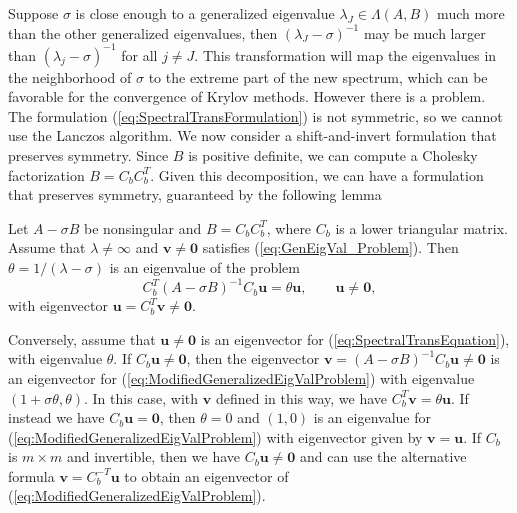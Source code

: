 Suppose $\sigma$ is close enough to a generalized eigenvalue $\lambda_J \in \Lambda(A, B)$ much more than the other generalized eigenvalues, then $(\lambda_J - \sigma)^{-1}$ may be much larger than $(\lambda_j - \sigma)^{-1}$ for all $j \neq J$. This transformation will map the eigenvalues in the neighborhood of $\sigma$ to the extreme part of the new spectrum, which can be favorable for the convergence of Krylov methods.  However there is a problem.  The formulation (\ref{eq:SpectralTransFormulation}) is not symmetric, so we cannot use the Lanczos algorithm.  We now consider a shift-and-invert formulation that preserves symmetry. Since $B$ is positive definite, we can compute a Cholesky factorization $B = C_bC_b^T$. Given this decomposition, we can have a formulation that preserves symmetry, guaranteed by the following lemma
 \begin{lemma}\label{lemma:SpectralTransLemma}
 	Let $A-\sigma B$ be nonsingular and $B = C_bC_b^T$, where $C_b$ is a lower triangular matrix. Assume that $\lambda \neq \infty$ and $\mathbf{v} \neq \mathbf{0}$ satisfies (\ref{eq:GenEigVal_Problem}). Then $\theta = 1/(\lambda - \sigma)$  is an eigenvalue of the problem
 	\begin{equation}\label{eq:SpectralTransEquation}
 		C_b^T(A-\sigma B)^{-1}C_b \mathbf{u} = \theta \mathbf{u}, \qquad \mathbf{u} \neq \mathbf{0},
 	\end{equation}
 	with eigenvector $\mathbf{u} = C_b^T\mathbf{v} \neq \mathbf{0}$.
 	
 	Conversely, assume that $\mathbf{u} \neq \mathbf{0}$ is an eigenvector for (\ref{eq:SpectralTransEquation}), with eigenvalue $\theta$. If $C_b\mathbf{u} \neq \mathbf{0}$, then the eigenvector $\mathbf{v} = (A -\sigma B)^{-1}C_b\mathbf{u} \neq \mathbf{0}$ is an eigenvector for (\ref{eq:ModifiedGeneralizedEigValProblem}) with eigenvalue $(1+\sigma \theta, \theta)$. In this case, with $\mathbf{v}$ defined in this way, we have $C_b^T\mathbf{v} = \theta \mathbf{u}$. If instead we have $C_b\mathbf{u} = \mathbf{0}$, then $\theta = 0$ and $(1, 0)$ is an eigenvalue for (\ref{eq:ModifiedGeneralizedEigValProblem}) with eigenvector given by $\mathbf{v} = \mathbf{u}$. If $C_b$ is $m \times m$ and invertible, then we have $C_b\mathbf{u} \neq \mathbf{0}$ and can use the alternative formula $\mathbf{v} = C_b^{-T}\mathbf{u}$ to obtain an eigenvector of (\ref{eq:ModifiedGeneralizedEigValProblem}).
 \end{lemma}
